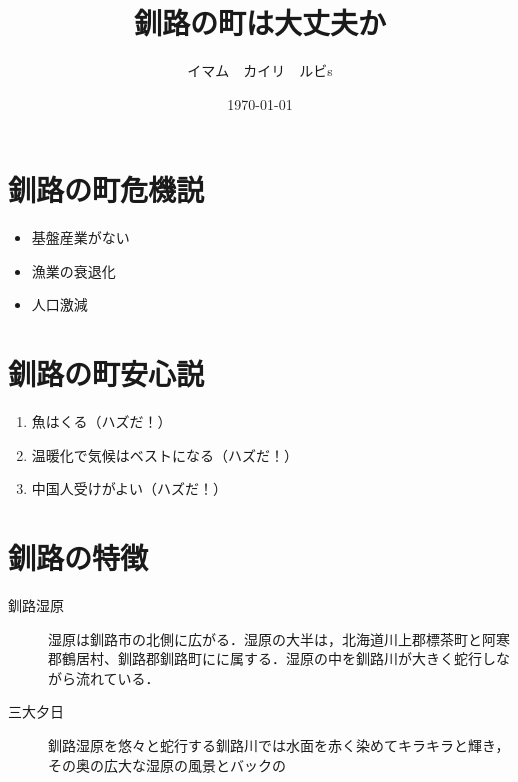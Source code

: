 \documentclass[a4j]{jarticle}
\begin{document}
\title{釧路の町は大丈夫か}
\author{イマム　カイリ　ルビs} 
\date{\today}

\maketitle


\section{釧路の町危機説}

\begin{itemize}
    \item 基盤産業がない
    \item 漁業の衰退化
    \item 人口激減
\end{itemize}


\section{釧路の町安心説}

\begin{enumerate}
    \item 魚はくる（ハズだ！）\cite{bib1}
    \item 温暖化で気候はベストになる（ハズだ！）
    \item 中国人受けがよい（ハズだ！）
\end{enumerate}


\section{釧路の特徴}
\begin{description}
    \item[釧路湿原]
    湿原は釧路市の北側に広がる．湿原の大半は，北海道川上郡標茶町と阿寒郡鶴居村、釧路郡釧路町にに属する．湿原の中を釧路川が大きく蛇行しながら流れている．\cite{bib2}

    \item[三大夕日]
    釧路湿原を悠々と蛇行する釧路川では水面を赤く染めてキラキラと輝き，その奥の広大な湿原の風景とバックの
\end{description}
\end{document}
